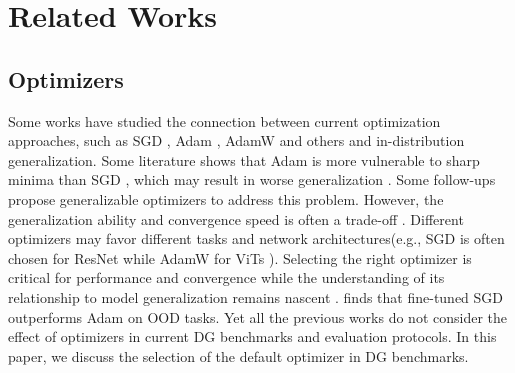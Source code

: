 \section{Related Works}
\subsection{Optimizers}
Some works \cite{xie2022adaptive,foret2021sharpness} have studied the connection between current optimization approaches, such as SGD \cite{nesterov1983method}, Adam \cite{DBLP:journals/corr/KingmaB14}, AdamW \cite{loshchilov2017decoupled} and others \cite{duchi2011adaptive,DBLP:conf/iclr/LiuJHCLG020} and in-distribution generalization. Some literature shows that Adam is more vulnerable to sharp minima than SGD \cite{wilson2017marginal}, which may result in worse generalization \cite{xie2022power, hardt2016train, hochreiter1994simplifying}. Some follow-ups \cite{luo2019adaptive,chen2018closing,xie2022adaptive,zaheer2018adaptive} propose generalizable optimizers to address this problem. 
However, the generalization ability and convergence speed is often a trade-off \cite{DBLP:conf/iclr/KeskarMNST17,xie2022adaptive,DBLP:conf/iclr/LiuJHCLG020,zaheer2018adaptive,duchi2011adaptive}. 
Different optimizers may favor different tasks and network architectures(e.g., SGD is often chosen for ResNet \cite{he2016deep} while AdamW \cite{loshchilov2017decoupled} for ViTs \cite{dosovitskiy2020image}). Selecting the right optimizer is critical for performance and convergence while the understanding of its relationship to model generalization remains nascent \cite{foret2021sharpness}. 
\cite{naganuma2022empirical} finds that fine-tuned SGD outperforms Adam on OOD tasks. Yet all the previous works do not consider the effect of optimizers in current DG benchmarks and evaluation protocols. In this paper, we discuss the selection of the default optimizer in DG benchmarks.


